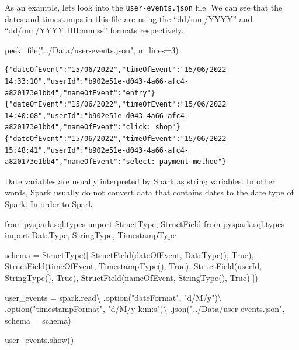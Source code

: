 \documentclass[
  11pt,
  letterpaper,
  DIV=11,
  numbers=noendperiod]{scrreprt}
\newenvironment{Shaded}{\begin{snugshade}}{\end{snugshade}}
\newcommand{\DecValTok}[1]{\textcolor[rgb]{0.68,0.00,0.00}{#1}}
\newcommand{\ImportTok}[1]{\textcolor[rgb]{0.00,0.46,0.62}{#1}}
\newcommand{\NormalTok}[1]{\textcolor[rgb]{0.00,0.23,0.31}{#1}}
\newcommand{\OperatorTok}[1]{\textcolor[rgb]{0.37,0.37,0.37}{#1}}
\newcommand{\StringTok}[1]{\textcolor[rgb]{0.13,0.47,0.30}{#1}}
\newcommand{\VariableTok}[1]{\textcolor[rgb]{0.07,0.07,0.07}{#1}}
\begin{document}
As an example, lets look into the \texttt{user-events.json} file. We can
see that the dates and timestamps in this file are using the
``dd/mm/YYYY'' and ``dd/mm/YYYY HH:mm:ss'' formats respectively.

\begin{Shaded}
\begin{Highlighting}[]
\NormalTok{peek\_file(}\StringTok{"../Data/user{-}events.json"}\NormalTok{, n\_lines}\OperatorTok{=}\DecValTok{3}\NormalTok{)}
\end{Highlighting}
\end{Shaded}

\begin{verbatim}
{"dateOfEvent":"15/06/2022","timeOfEvent":"15/06/2022 14:33:10","userId":"b902e51e-d043-4a66-afc4-a820173e1bb4","nameOfEvent":"entry"}
{"dateOfEvent":"15/06/2022","timeOfEvent":"15/06/2022 14:40:08","userId":"b902e51e-d043-4a66-afc4-a820173e1bb4","nameOfEvent":"click: shop"}
{"dateOfEvent":"15/06/2022","timeOfEvent":"15/06/2022 15:48:41","userId":"b902e51e-d043-4a66-afc4-a820173e1bb4","nameOfEvent":"select: payment-method"}
\end{verbatim}

Date variables are usually interpreted by Spark as string variables. In
other words, Spark usually do not convert data that contains dates to
the date type of Spark. In order to Spark

\begin{Shaded}
\begin{Highlighting}[]
\ImportTok{from}\NormalTok{ pyspark.sql.types }\ImportTok{import}\NormalTok{ StructType, StructField}
\ImportTok{from}\NormalTok{ pyspark.sql.types }\ImportTok{import}\NormalTok{ DateType, StringType, TimestampType}

\NormalTok{schema }\OperatorTok{=}\NormalTok{ StructType([}
\NormalTok{  StructField(}\StringTok{\textquotesingle{}dateOfEvent\textquotesingle{}}\NormalTok{, DateType(), }\VariableTok{True}\NormalTok{),}
\NormalTok{  StructField(}\StringTok{\textquotesingle{}timeOfEvent\textquotesingle{}}\NormalTok{, TimestampType(), }\VariableTok{True}\NormalTok{),}
\NormalTok{  StructField(}\StringTok{\textquotesingle{}userId\textquotesingle{}}\NormalTok{, StringType(), }\VariableTok{True}\NormalTok{),}
\NormalTok{  StructField(}\StringTok{\textquotesingle{}nameOfEvent\textquotesingle{}}\NormalTok{, StringType(), }\VariableTok{True}\NormalTok{)}
\NormalTok{])}

\NormalTok{user\_events }\OperatorTok{=}\NormalTok{ spark.read}\OperatorTok{\textbackslash{}}
\NormalTok{  .option(}\StringTok{"dateFormat"}\NormalTok{, }\StringTok{"d/M/y"}\NormalTok{)}\OperatorTok{\textbackslash{}}
\NormalTok{  .option(}\StringTok{"timestampFormat"}\NormalTok{, }\StringTok{"d/M/y k:m:s"}\NormalTok{)}\OperatorTok{\textbackslash{}}
\NormalTok{  .json(}\StringTok{"../Data/user{-}events.json"}\NormalTok{, schema }\OperatorTok{=}\NormalTok{ schema)}
  
\NormalTok{user\_events.show()}
\end{Highlighting}
\end{Shaded}
\end{document}

